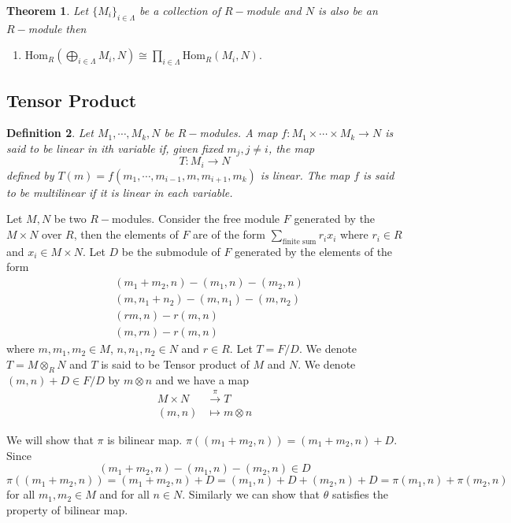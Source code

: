 \documentclass[11pt]{amsart}
\newtheorem{theorem}{Theorem}[section]
\newtheorem{defn}[theorem]{Definition}
\newcommand{\Hom}[1]{\text{Hom}_R\left(#1\right)}
\begin{document}
\begin{theorem}
Let $\{M_i\}_{i\in\Lambda}$ be a collection of $R-$module and $N$ is also be an $R-$module then
\begin{enumerate}
\item $\Hom{\displaystyle\bigoplus_{i\in\Lambda}M_i,N}\cong \displaystyle\prod_{i\in \Lambda}\Hom{M_i,N}.$
\end{enumerate}
\end{theorem}









\newpage

\subsection{Tensor Product}
\begin{defn}
Let $M_1,\cdots,M_k,N$ be $R-$modules. A map $f:M_1\times \cdots\times M_k\to N$ is said to be linear in ith variable if, given fixed $m_j,j\neq i$, the map $$T:M_i\to N$$ defined by $T(m)=f(m_1,\cdots,m_{i-1},m,m_{i+1},m_k)$ is linear. The map $f$ is said to be multilinear if it is linear in each variable.
\end{defn}

Let $M, N$ be two $R-$modules. Consider the free module $F$ generated by the $M\times N$ over $R$, then the elements of $F$ are of the form $\displaystyle\sum_{\text{finite sum}} r_ix_i$ where $r_i\in R$ and $x_i\in M\times N.$ Let $D$ be the submodule of $F$ generated by the elements of the form \begin{align*}
&(m_1+m_2,n)-(m_1,n)-(m_2,n)\\
&(m,n_1+n_2)-(m,n_1)-(m,n_2)\\
&(rm,n)-r(m,n)\\
&(m,rn)-r(m,n)
\end{align*}
where $m,m_1,m_2\in M$, $n,n_1,n_2\in N$ and $r\in R.$ Let $T=F/D.$ We denote $T=M\otimes_R N$ and $T$ is said to be Tensor product of $M$ and $N$. We denote $(m,n)+D\in F/D$ by $m\otimes n$ and we have a map \begin{align*}
M\times N&\stackrel{\pi}{\to} T\\
(m,n)&\mapsto m\otimes n
\end{align*}

We will show that $\pi$ is bilinear map. $\pi((m_1+m_2,n))=(m_1+m_2,n)+D.$ Since $$(m_1+m_2,n)-(m_1,n)-(m_2,n)\in D$$
$\pi((m_1+m_2,n))=(m_1+m_2,n)+D=(m_1,n)+D+(m_2,n)+D=\pi(m_1,n)+\pi(m_2,n)$ for all $m_1,m_2\in M$ and for all $n\in N$. Similarly we can show that $\theta$ satisfies the property of bilinear map.
\end{document}
